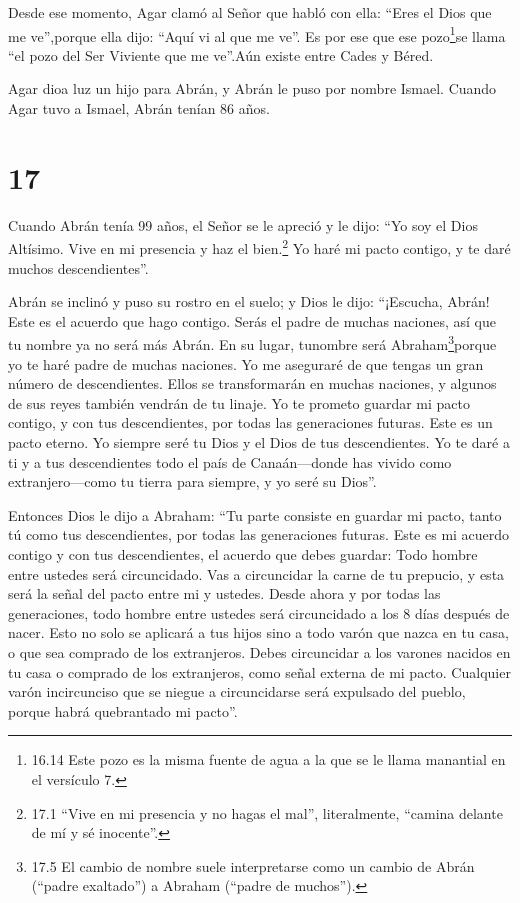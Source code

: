 Desde ese momento, Agar clamó al Señor que habló con ella:
``Eres el Dios que me ve'',porque ella dijo: ``Aquí vi al que me ve''.
 Es por ese que ese pozo\footnote{16.14 Este pozo es la
  misma fuente de agua a la que se le llama manantial en el versículo 7.}se
llama ``el pozo del Ser Viviente que me ve''.Aún existe entre Cades y
Béred.

 Agar dioa luz un hijo para Abrán, y Abrán le puso por
nombre Ismael.  Cuando Agar tuvo a Ismael, Abrán tenían 86
años.

\hypertarget{section-16}{%
\section{17}\label{section-16}}

 Cuando Abrán tenía 99 años, el Señor se le apreció y le
dijo: ``Yo soy el Dios Altísimo. Vive en mi presencia y haz el
bien.\footnote{17.1 ``Vive en mi presencia y no hagas el mal'',
  literalmente, ``camina delante de mí y sé inocente''.}  Yo
haré mi pacto contigo, y te daré muchos descendientes''.

 Abrán se inclinó y puso su rostro en el suelo; y Dios le
dijo:  ``¡Escucha, Abrán! Este es el acuerdo que hago
contigo. Serás el padre de muchas naciones,  así que tu
nombre ya no será más Abrán. En su lugar, tunombre será
Abraham\footnote{17.5 El cambio de nombre suele interpretarse como un
  cambio de Abrán (``padre exaltado'') a Abraham (``padre de muchos'').}porque
yo te haré padre de muchas naciones.  Yo me aseguraré de que
tengas un gran número de descendientes. Ellos se transformarán en muchas
naciones, y algunos de sus reyes también vendrán de tu linaje.
 Yo te prometo guardar mi pacto contigo, y con tus
descendientes, por todas las generaciones futuras. Este es un pacto
eterno. Yo siempre seré tu Dios y el Dios de tus descendientes.
 Yo te daré a ti y a tus descendientes todo el país de
Canaán---donde has vivido como extranjero---como tu tierra para siempre,
y yo seré su Dios''.

 Entonces Dios le dijo a Abraham: ``Tu parte consiste en
guardar mi pacto, tanto tú como tus descendientes, por todas las
generaciones futuras.  Este es mi acuerdo contigo y con tus
descendientes, el acuerdo que debes guardar: Todo hombre entre ustedes
será circuncidado.  Vas a circuncidar la carne de tu
prepucio, y esta será la señal del pacto entre mi y ustedes.
 Desde ahora y por todas las generaciones, todo hombre
entre ustedes será circuncidado a los 8 días después de nacer. Esto no
solo se aplicará a tus hijos sino a todo varón que nazca en tu casa, o
que sea comprado de los extranjeros.  Debes circuncidar a
los varones nacidos en tu casa o comprado de los extranjeros, como señal
externa de mi pacto.  Cualquier varón incircunciso que se
niegue a circuncidarse será expulsado del pueblo, porque habrá
quebrantado mi pacto''.

